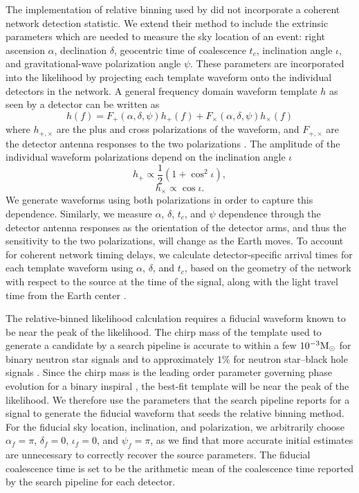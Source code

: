 The implementation of relative binning used by \cite{Zackay:2018qdy} did not incorporate a coherent network detection statistic. We extend their method to include the extrinsic parameters which are needed to measure the sky location of an event: right ascension $\alpha$, declination $\delta$, geocentric time of coalescence $t_c$, inclination angle $\iota$, and gravitational-wave polarization angle $\psi$. These parameters are incorporated into the likelihood by projecting each template waveform onto the individual detectors in the network. A general frequency domain waveform template $h$ as seen by a detector can be written as
\begin{equation}
    h(f)=F_{+}(\alpha,\delta,\psi)h_{+}(f) + F_{\times}(\alpha,\delta,\psi)h_{\times}(f)
\end{equation}
where $h_{+,\times}$ are the plus and cross polarizations of the waveform, and $F_{+,\times}$ are the detector antenna responses to the two polarizations \cite{Anderson_2001}. The amplitude of the individual waveform polarizations depend on the inclination angle $\iota$ \cite{thorne.k:1987}
\begin{equation}
    h_{+}\propto \frac{1}{2}(1+\cos^{2}{\iota}),
\end{equation}
\begin{equation}
    h_{\times}\propto \cos{\iota}.
\end{equation}
We generate waveforms using both polarizations in order to capture this dependence. Similarly, we measure $\alpha$, $\delta$, $t_{c}$, and $\psi$ dependence through the detector antenna responses as the orientation of the detector arms, and thus the sensitivity to the two polarizations, will change as the Earth moves. To account for coherent network timing delays, we calculate detector-specific arrival times for each template waveform using $\alpha$, $\delta$, and $t_{c}$, based on the geometry of the network with respect to the source at the time of the signal, along with the light travel time from the Earth center \cite{Fairhurst:2009tc}.

The relative-binned likelihood calculation requires a fiducial waveform known to be near the peak of the likelihood. The chirp mass of the template used to generate a candidate by a search pipeline is accurate to within a few $10^{-3} \mathrm{M}_{\odot}$ for binary neutron star signals \cite{Berry_2016,Biscoveanu_2019} and to approximately $1\%$ for neutron star--black hole signals \cite{canton2020realtime}. Since the chirp mass is the leading order parameter governing phase evolution for a binary inspiral \cite{Peters:1963ux}, the best-fit template will be near the peak of the likelihood. We therefore use the parameters that the search pipeline reports for a signal to generate the fiducial waveform that seeds the relative binning method. For the fiducial sky location, inclination, and polarization, we arbitrarily choose $\alpha_{f}=\pi$, $\delta_{f}=0$, $\iota_{f}=0$, and $\psi_{f}=\pi$, as we find that more accurate initial estimates are unnecessary to correctly recover the source parameters. The fiducial coalescence time is set to be the arithmetic mean of the coalescence time reported by the search pipeline for each detector.


